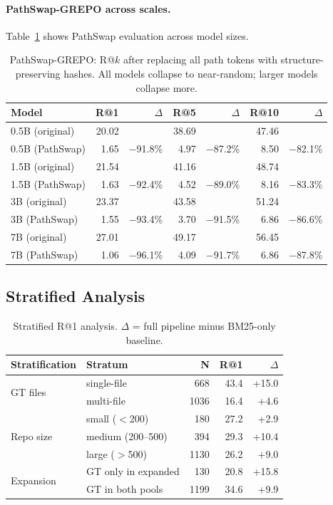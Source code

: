 \documentclass{article}
\begin{document}
\paragraph{PathSwap-GREPO across scales.}
Table~\ref{tab:pathswap} shows PathSwap evaluation across model sizes.

\begin{table}[h]
\centering
\caption{PathSwap-GREPO: R@$k$ after replacing all path tokens with structure-preserving hashes. All models collapse to near-random; larger models collapse more.}
\label{tab:pathswap}
\small
\begin{tabular}{lrrrrrr}
\toprule
\textbf{Model} & \textbf{R@1} & \textbf{$\Delta$} & \textbf{R@5} & \textbf{$\Delta$} & \textbf{R@10} & \textbf{$\Delta$} \\
\midrule
0.5B (original) & 20.02 & & 38.69 & & 47.46 & \\
0.5B (PathSwap) & 1.65 & $-$91.8\% & 4.97 & $-$87.2\% & 8.50 & $-$82.1\% \\
\midrule
1.5B (original) & 21.54 & & 41.16 & & 48.74 & \\
1.5B (PathSwap) & 1.63 & $-$92.4\% & 4.52 & $-$89.0\% & 8.16 & $-$83.3\% \\
\midrule
3B (original) & 23.37 & & 43.58 & & 51.24 & \\
3B (PathSwap) & 1.55 & $-$93.4\% & 3.70 & $-$91.5\% & 6.86 & $-$86.6\% \\
\midrule
7B (original) & 27.01 & & 49.17 & & 56.45 & \\
7B (PathSwap) & 1.06 & $-$96.1\% & 4.09 & $-$91.7\% & 6.86 & $-$87.8\% \\
\bottomrule
\end{tabular}
\end{table}


\subsection{Stratified Analysis}
\label{app:stratified}

\begin{table}[h]
\centering
\caption{Stratified R@1 analysis. $\Delta$ = full pipeline minus BM25-only baseline.}
\label{tab:stratified}
\small
\begin{tabular}{llrrr}
\toprule
\textbf{Stratification} & \textbf{Stratum} & \textbf{N} & \textbf{R@1} & \textbf{$\Delta$} \\
\midrule
\multirow{2}{*}{GT files} & single-file & 668 & 43.4 & +15.0 \\
 & multi-file & 1036 & 16.4 & +4.6 \\
\midrule
\multirow{3}{*}{Repo size} & small ($<$200) & 180 & 27.2 & +2.9 \\
 & medium (200--500) & 394 & 29.3 & +10.4 \\
 & large ($>$500) & 1130 & 26.2 & +9.0 \\
\midrule
\multirow{2}{*}{Expansion} & GT only in expanded & 130 & 20.8 & +15.8 \\
 & GT in both pools & 1199 & 34.6 & +9.9 \\
\bottomrule
\end{tabular}
\end{table}
\end{document}
